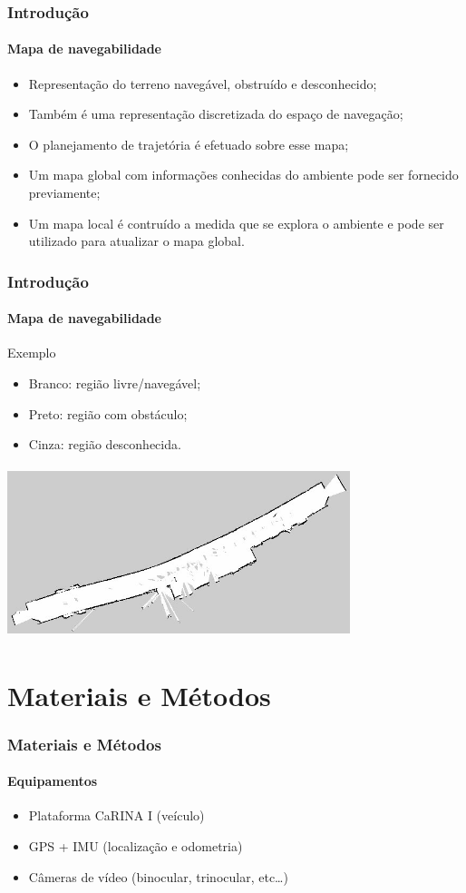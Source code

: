 \documentclass[brazil]{beamer}
\begin{document}
\begin{frame}
\frametitle{Introdução}
\framesubtitle{Mapa de navegabilidade}
\begin{itemize}
  \item Representação do terreno navegável, obstruído e desconhecido;
  \item Também é uma representação discretizada do espaço de navegação;
  \item O planejamento de trajetória é efetuado sobre esse mapa;
  \item Um mapa global com informações conhecidas do ambiente pode ser fornecido
  previamente;
  \item Um mapa local é contruído a medida que se explora o ambiente e pode ser
  utilizado para atualizar o mapa global.
 \end{itemize}
\end{frame}

\begin{frame}
\frametitle{Introdução}
\framesubtitle{Mapa de navegabilidade}
Exemplo
\begin{itemize}
  \item Branco: região livre/navegável;
  \item Preto: região com obstáculo;
  \item Cinza: região desconhecida.
\end{itemize}
\includegraphics[width=10cm,height=5cm,]{../img/map_2d.jpg}
\end{frame}


\section{Materiais e Métodos}


\begin{frame}
\frametitle{Materiais e Métodos}
\framesubtitle{Equipamentos}
\begin{itemize}
\item Plataforma CaRINA I (veículo)
\item GPS + IMU (localização e odometria)
\item Câmeras de vídeo (binocular, trinocular, etc\ldots)
\end{itemize}
\end{frame}
\end{document}
